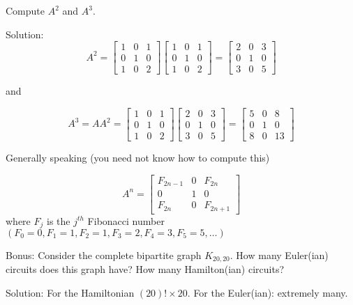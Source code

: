 \documentclass[16 pt]{amsart}
\theoremstyle{definition}
\theoremstyle{remark}
\numberwithin{equation}{subsection}
\begin{document}
Compute $A^2$ and $A^3$.

\vspace{1in}

Solution:
\[
A^2 = \begin{bmatrix}
1 & 0 & 1\\
0 & 1 & 0\\
1 & 0 & 2
\end{bmatrix}
\begin{bmatrix}
1 & 0 & 1\\
0 & 1 & 0\\
1 & 0 & 2
\end{bmatrix} = \begin{bmatrix}
2 & 0 & 3\\
0 & 1 & 0\\
3 & 0 & 5
\end{bmatrix}
\]

and

\[
A^3 = A A^2 = \begin{bmatrix}
1 & 0 & 1\\
0 & 1 & 0\\
1 & 0 & 2
\end{bmatrix}  \begin{bmatrix}
2 & 0 & 3\\
0 & 1 & 0\\
3 & 0 & 5
\end{bmatrix} = 
\begin{bmatrix}
5 & 0 & 8\\
0 & 1 & 0\\
8 & 0 & 13
\end{bmatrix}
\]

Generally speaking (you need not know how to compute this)

\[
A^n = \begin{bmatrix}
F_{2n-1} & 0 & F_{2n}\\
0 & 1 & 0 \\
F_{2n} & 0 & F_{2n+1}
\end{bmatrix}
\]
where $F_j$ is the $j^{th}$ Fibonacci number $(F_0=0,F_1=1,F_2=1,F_3=2,F_4=3,F_5=5,\dots)$
\newpage

Bonus: Consider the complete bipartite graph $K_{20,20}$.  How many Euler(ian) circuits does this graph have?  How many Hamilton(ian) circuits?

\vspace{1in}

Solution: For the Hamiltonian $(20)!\times 20$.  
For the Euler(ian): extremely many.
\end{document}

